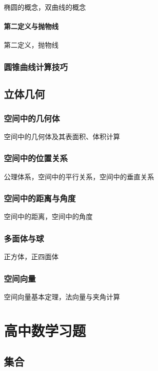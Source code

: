 \documentclass[lang=cn, zihao=4.5]{elegantbook}
\begin{document}
椭圆的概念，双曲线的概念

\subsection{第二定义与抛物线}

第二定义，抛物线

\section{圆锥曲线计算技巧}



\chapter{立体几何}

\section{空间中的几何体}

空间中的几何体及其表面积、体积计算

\section{空间中的位置关系}

公理体系，空间中的平行关系，空间中的垂直关系

\section{空间中的距离与角度}

空间中的距离，空间中的角度

\section{多面体与球}

正方体，正四面体

\section{空间向量}

空间向量基本定理，法向量与夹角计算

\setcounter{chapter}{0}
\part{高中数学习题}

\chapter{集合}
\end{document}
